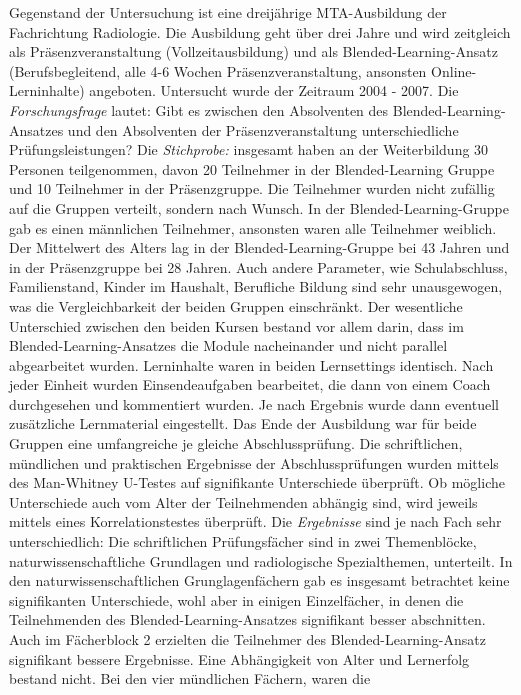 \documentclass[12pt, bibliography=totoc]{scrartcl}
\begin{document}
Gegenstand der Untersuchung ist eine dreijährige MTA-Ausbildung der
Fachrichtung Radiologie. Die Ausbildung geht über drei Jahre und wird
zeitgleich als Präsenzveranstaltung (Vollzeitausbildung) und als
Blended-Learning-Ansatz (Berufsbegleitend, alle 4-6 Wochen
Präsenzveranstaltung, ansonsten Online-Lerninhalte) angeboten.
Untersucht wurde der Zeitraum 2004 - 2007. Die \emph{Forschungsfrage}
lautet: Gibt es zwischen den Absolventen des Blended-Learning-Ansatzes
und den Absolventen der Präsenzveranstaltung unterschiedliche
Prüfungsleistungen? Die \emph{Stichprobe:} insgesamt haben an der
Weiterbildung 30 Personen teilgenommen, davon 20 Teilnehmer in der
Blended-Learning Gruppe und 10 Teilnehmer in der Präsenzgruppe. Die
Teilnehmer wurden nicht zufällig auf die Gruppen verteilt, sondern nach
Wunsch. In der Blended-Learning-Gruppe gab es einen männlichen
Teilnehmer, ansonsten waren alle Teilnehmer weiblich. Der Mittelwert des
Alters lag in der Blended-Learning-Gruppe bei 43 Jahren und in der
Präsenzgruppe bei 28 Jahren. Auch andere Parameter, wie Schulabschluss,
Familienstand, Kinder im Haushalt, Berufliche Bildung sind sehr
unausgewogen, was die Vergleichbarkeit der beiden Gruppen einschränkt.
Der wesentliche Unterschied zwischen den beiden Kursen bestand vor allem
darin, dass im Blended-Learning-Ansatzes die Module nacheinander und
nicht parallel abgearbeitet wurden. Lerninhalte waren in beiden
Lernsettings identisch. Nach jeder Einheit wurden Einsendeaufgaben
bearbeitet, die dann von einem Coach durchgesehen und kommentiert
wurden. Je nach Ergebnis wurde dann eventuell zusätzliche Lernmaterial
eingestellt. Das Ende der Ausbildung war für beide Gruppen eine
umfangreiche je gleiche Abschlussprüfung. Die schriftlichen, mündlichen
und praktischen Ergebnisse der Abschlussprüfungen wurden mittels des
Man-Whitney U-Testes auf signifikante Unterschiede überprüft. Ob
mögliche Unterschiede auch vom Alter der Teilnehmenden abhängig sind,
wird jeweils mittels eines Korrelationstestes überprüft. Die
\emph{Ergebnisse} sind je nach Fach sehr unterschiedlich: Die
schriftlichen Prüfungsfächer sind in zwei Themenblöcke,
naturwissenschaftliche Grundlagen und radiologische Spezialthemen,
unterteilt. In den naturwissenschaftlichen Grunglagenfächern gab es
insgesamt betrachtet keine signifikanten Unterschiede, wohl aber in
einigen Einzelfächer, in denen die Teilnehmenden des
Blended-Learning-Ansatzes signifikant besser abschnitten. Auch im
Fächerblock 2 erzielten die Teilnehmer des Blended-Learning-Ansatz
signifikant bessere Ergebnisse. Eine Abhängigkeit von Alter und
Lernerfolg bestand nicht. Bei den vier mündlichen Fächern, waren die
\end{document}
